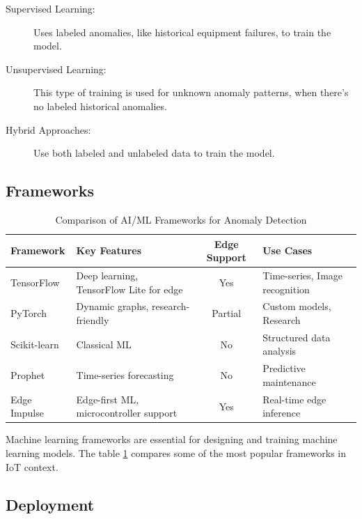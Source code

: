 \begin{description}
	\item[Supervised Learning: ] Uses labeled anomalies, like historical equipment
	      failures, to train the model.


	\item[Unsupervised Learning: ] This type of training is used for unknown
	      anomaly patterns, when there's no labeled historical anomalies.


	\item[Hybrid Approaches: ] Use both labeled and unlabeled data to train the
	      model.
\end{description}

\subsection{Frameworks}
\begin{table}[ht]
	\centering
	\caption{Comparison of \gls{AI}/\gls{ML} Frameworks for Anomaly Detection}
	\label{tab:ai-ml:frameworks}
	\begin{tabular}{p{2cm}p{4cm}cp{3cm}}
		\toprule
		\textbf{Framework} & \textbf{Key Features}                        & \textbf{Edge Support} & \textbf{Use Cases}             \\
		\midrule
		TensorFlow         & Deep learning, TensorFlow Lite for edge      & Yes                   & Time-series, Image recognition \\
		PyTorch            & Dynamic graphs, research-friendly            & Partial               & Custom models, Research        \\
		Scikit-learn       & Classical \gls{ML}                           & No                    & Structured data analysis       \\
		Prophet            & Time-series forecasting                      & No                    & Predictive maintenance         \\
		Edge Impulse       & Edge-first \gls{ML}, microcontroller support & Yes                   & Real-time edge inference       \\
		\bottomrule
	\end{tabular}
\end{table}

Machine learning frameworks are essential for designing and training machine
learning models. The table \ref{tab:ai-ml:frameworks}
compares some of the most popular frameworks in \gls{IoT} context.

\subsection{Deployment}


